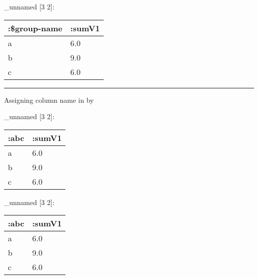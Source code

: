 \documentclass[]{article}
\newenvironment{Shaded}{\begin{snugshade}}{\end{snugshade}}
\newcommand{\AttributeTok}[1]{\textcolor[rgb]{0.77,0.63,0.00}{#1}}
\newcommand{\KeywordTok}[1]{\textcolor[rgb]{0.13,0.29,0.53}{\textbf{#1}}}
\newcommand{\NormalTok}[1]{#1}
\newcommand{\VariableTok}[1]{\textcolor[rgb]{0.00,0.00,0.00}{#1}}
\begin{document}
\_unnamed {[}3 2{]}:

\begin{longtable}[]{@{}ll@{}}
\toprule
:\$group-name & :sumV1\tabularnewline
\midrule
\endhead
a & 6.0\tabularnewline
b & 9.0\tabularnewline
c & 6.0\tabularnewline
\bottomrule
\end{longtable}

\begin{center}\rule{0.5\linewidth}{0.5pt}\end{center}

Assigning column name in by

\begin{Shaded}
\end{Shaded}

\_unnamed {[}3 2{]}:

\begin{longtable}[]{@{}ll@{}}
\toprule
:abc & :sumV1\tabularnewline
\midrule
\endhead
a & 6.0\tabularnewline
b & 9.0\tabularnewline
c & 6.0\tabularnewline
\bottomrule
\end{longtable}

\begin{Shaded}
\end{Shaded}

\_unnamed {[}3 2{]}:

\begin{longtable}[]{@{}ll@{}}
\toprule
:abc & :sumV1\tabularnewline
\midrule
\endhead
a & 6.0\tabularnewline
b & 9.0\tabularnewline
c & 6.0\tabularnewline
\bottomrule
\end{longtable}
\end{document}

